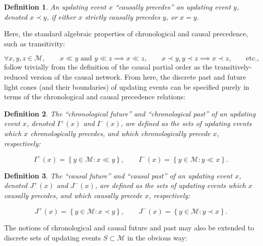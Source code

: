 \documentclass{article}
\newtheorem{definition}{Definition}
\begin{document}
\begin{definition}
An updating event $x$ ``causally precedes'' an updating event $y$, denoted ${x \prec y}$, if either $x$ strictly causally precedes $y$, or ${x = y}$.
\end{definition}
Here, the standard algebraic properties of chronological and causal precedence, such as transitivity:

\begin{equation}
\forall x, y, z \in \mathcal{M}, \qquad x \ll y \text{ and } y \ll z \implies x \ll z, \qquad x \prec y, y \prec z \implies x \prec z, \qquad \text{etc.},
\end{equation}
follow trivially from the definition of the causal partial order as the transitively-reduced version of the causal network. From here, the discrete past and future light cones (and their boundaries) of updating events can be specified purely in terms of the chronological and causal precedence relations:

\begin{definition}
The ``chronological future'' and ``chronological past'' of an updating event $x$, denoted ${I^{+} \left( x \right)}$ and ${I^{-} \left( x \right)}$, are defined as the sets of updating events which $x$ chronologically precedes, and which chronologically precede $x$, respectively:

\begin{equation}
I^{+} \left( x \right) = \left\lbrace y \in \mathcal{M} : x \ll y \right\rbrace, \qquad I^{-} \left( x \right) = \left\lbrace y \in \mathcal{M} : y \ll x \right\rbrace.
\end{equation}
\end{definition}

\begin{definition}
The ``causal future'' and ``causal past'' of an updating event $x$, denoted ${J^{+} \left( x \right)}$ and ${J^{-} \left( x \right)}$, are defined as the sets of updating events which $x$ causally precedes, and which causally precede $x$, respectively:

\begin{equation}
J^{+} \left( x \right) = \left\lbrace y \in \mathcal{M} : x \prec y \right\rbrace, \qquad J^{-} \left( x \right) = \left\lbrace y \in \mathcal{M} : y \prec x \right\rbrace.
\end{equation}
\end{definition}
The notions of chronological and causal future and past may also be extended to discrete sets of updating events ${S \subset \mathcal{M}}$ in the obvious way:
\end{document}
